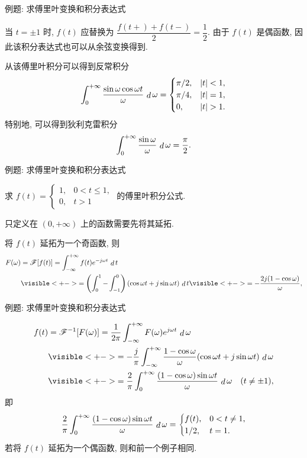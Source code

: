 \begin{frame}{例题: 求傅里叶变换和积分表达式}
\begin{solutione}
当 $t=\pm1$ 时, $f(t)$ 应替换为 $\dfrac{f(t+)+f(t-)}2=\dfrac12$.
\onslide<+->
由于 $f(t)$ 是偶函数, 因此该积分表达式也可以从余弦变换得到.
\end{solutione}
\onslide<+->
从该傅里叶积分可以得到反常积分
\[\int_0^{+\infty}\frac{\sin \omega\cos{\omega t}}\omega\diff\omega=\begin{cases}
\pi/2,&|t|<1,\\
\pi/4,&|t|=1,\\
0,&|t|>1.
\end{cases}\]
\onslide<+->
特别地, 可以得到狄利克雷积分
\[\int_0^{+\infty}\frac{\sin\omega}\omega\,\mathop{d}\omega=\frac\pi2.\]
\end{frame}


\begin{frame}{例题: 求傅里叶变换和积分表达式}
\beqskip{5pt}
\begin{example}
求 $f(t)=
	\begin{cases}
		1,&0<t\le 1,\\
		0,&t>1	
	\end{cases}$ 的傅里叶积分公式.
\end{example}
\begin{analysis}
只定义在 $(0,+\infty)$ 上的函数需要先将其延拓.
\end{analysis}
\begin{solutions}
将 $f(t)$ 延拓为一个奇函数,
\onslide<+->
则
\begin{align*}
F(\omega)&=\msf[f(t)]=\int_{-\infty}^{+\infty}f(t)e^{-j\omega t}\diff t\\
&\visible<+->{=\left(\int_0^1-\int_{-1}^0\right)(\cos{\omega t}+j\sin{\omega t})\diff t}\visible<+->{=-\frac{2j(1-\cos\omega)}\omega,}
\end{align*}
\end{solutions}
\endgroup
\end{frame}


\begin{frame}{例题: 求傅里叶变换和积分表达式}
\begin{solutione}
\vspace{-\baselineskip}
\begin{align*}
f(t)&=\msf^{-1}[F(\omega)]=\frac1{2\pi}\int_{-\infty}^{+\infty}F(\omega)e^{j\omega t}\diff\omega\\
&\visible<+->{=-\frac j\pi\int_{-\infty}^{+\infty}\frac{1-\cos\omega}\omega(\cos{\omega t}+j\sin{\omega t})\diff\omega}\\
&\visible<+->{=\frac2\pi\int_0^{+\infty}\frac{(1-\cos\omega)\sin{\omega t}}\omega\diff\omega\quad(t\neq\pm1),}
\end{align*}
\onslide<+->
即
\[\frac2\pi\int_0^{+\infty}\frac{(1-\cos\omega)\sin{\omega t}}\omega\,\mathop{d}\omega=
	\begin{cases}
		f(t),&0<t\neq1,\\
		1/2,&t=1.	
	\end{cases}\]
\onslide<+->
若将 $f(t)$ 延拓为一个偶函数, 则和前一个例子相同.
\end{solutione}
\end{frame}


